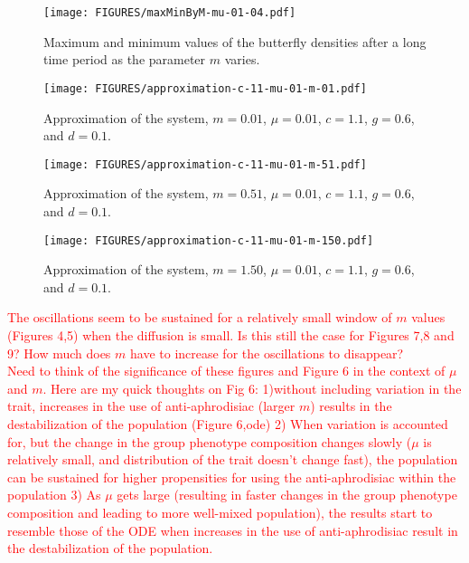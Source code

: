 \documentclass[review,authoryear]{elsarticle}
\begin{document}
\begin{figure}[htb]
  \centering
  \texttt{[image: FIGURES/maxMinByM-mu-01-04.pdf]}
  \caption[Maximum and minimum values of the butterfly
  density]{Maximum and minimum values of the butterfly densities after
    a long time period as the parameter $m$ varies.}
  \label{fig:maxMinButterflySmallMu}
\end{figure}

\begin{figure}[htb]
  \centering
  \texttt{[image: FIGURES/approximation-c-11-mu-01-m-01.pdf]}
  \caption[Approximation with $c=1.1$, $m=0.01$ and $\mu=0.01$.]{Approximation of
    the system, $m=0.01$, $\mu=0.01$, $c=1.1$, $g=0.6$, and $d=0.1$. }
  \label{fig:approximationM01Mu01C11}
\end{figure}

\begin{figure}[htb]
  \centering
  \texttt{[image: FIGURES/approximation-c-11-mu-01-m-51.pdf]}
  \caption[Approximation with $c=1.1$, $m=0.51$ and $\mu=0.01$.]{Approximation of
    the system, $m=0.51$, $\mu=0.01$, $c=1.1$, $g=0.6$, and $d=0.1$. }
  \label{fig:approximationM51Mu01C11}
\end{figure}


\begin{figure}[htb]
  \centering
  \texttt{[image: FIGURES/approximation-c-11-mu-01-m-150.pdf]}
  \caption[Approximation with $c=1.1$, $m=1.50$ and $\mu=0.01$.]{Approximation of
    the system, $m=1.50$, $\mu=0.01$, $c=1.1$, $g=0.6$, and $d=0.1$. }
  \label{fig:approximationM150Mu01C11}
\end{figure}
\textcolor{red}{The oscillations seem to be sustained for a relatively small window of $m$ values (Figures 4,5) when the diffusion is small. Is this still the case for Figures 7,8 and 9? How much does $m$ have to increase for the oscillations to disappear? 
\\Need to think of the significance of these figures and Figure 6 in the context of $\mu$ and $m$. Here are my quick thoughts on Fig 6: 1)without including variation in the trait, increases in the use of anti-aphrodisiac (larger $m$) results in the destabilization of the population (Figure 6,ode) 2) When variation is accounted for, but the change in the group phenotype composition changes slowly ($\mu$ is relatively small, and distribution of the trait doesn't change fast), the population can be sustained for higher propensities for using the anti-aphrodisiac within the population 3) As $\mu$ gets large (resulting in faster changes in the group phenotype composition and leading to more well-mixed population), the results start to resemble those of the ODE when increases in the use of anti-aphrodisiac result in the destabilization of the population.  }
\end{document}

